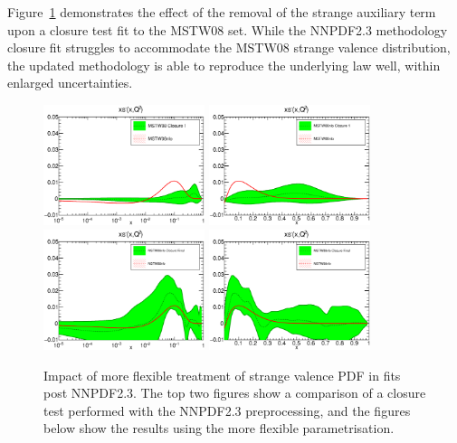 Figure~\ref{fig:preproc5} demonstrates the effect of the removal of the strange auxiliary term upon a closure test fit to the MSTW08 set. While the NNPDF2.3 methodology closure fit struggles to accommodate the MSTW08 strange valence distribution, the updated methodology is able to reproduce the underlying law well, within enlarged uncertainties.

\begin{figure}[h!]
\centering
\includegraphics[width=0.42\textwidth]{7-PostLHC/figs/Preproc1/pdf_xsminus_log_others.eps}
\includegraphics[width=0.42\textwidth]{7-PostLHC/figs/Preproc1/pdf_xsminus_others.eps}
\includegraphics[width=0.42\textwidth]{7-PostLHC/figs/PreprocFixed/pdf_xsminus_log_others.eps}
\includegraphics[width=0.42\textwidth]{7-PostLHC/figs/PreprocFixed/pdf_xsminus_others.eps}
\caption[Impact of more flexible treatment of strange valence PDF in fits post NNPDF2.3]{Impact of more flexible treatment of strange valence PDF in fits post NNPDF2.3. The top two figures show a comparison of a closure test performed with the NNPDF2.3 preprocessing, and the figures below show the results using the more flexible parametrisation.}
\label{fig:preproc5}
\end{figure}

